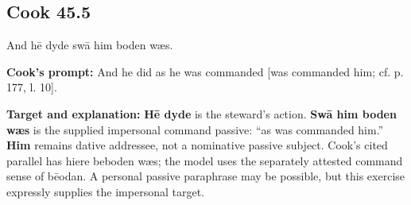 \par\begin{minipage}{\linewidth}\raggedright
\subsection*{Cook 45.5}

And hē dyde swā him boden wæs.

\textbf{Cook’s prompt:} And he did as he was commanded [was commanded him; cf. p. 177, l. 10].

\textbf{Target and explanation:} \textbf{Hē dyde} is the steward’s action. \textbf{Swā him boden wæs} is the supplied impersonal command passive: “as was commanded him.” \textbf{Him} remains dative addressee, not a nominative passive subject. Cook’s cited parallel has hiere beboden wæs; the model uses the separately attested command sense of bēodan. A personal passive paraphrase may be possible, but this exercise expressly supplies the impersonal target.

\end{minipage}\par\addvspace{4pt}

